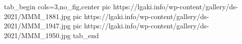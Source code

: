  
 
 
 
 


\ifcmt
  tab_begin cols=3,no_fig,center
     pic https://lgaki.info/wp-content/gallery/ds-2021/MMM_1881.jpg
     pic https://lgaki.info/wp-content/gallery/ds-2021/MMM_1947.jpg
     pic https://lgaki.info/wp-content/gallery/ds-2021/MMM_1950.jpg
  tab_end
\fi
